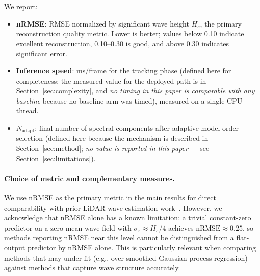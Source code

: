 \documentclass[review]{elsarticle}
\begin{document}
We report:
\begin{itemize}
  \item \textbf{nRMSE}: RMSE normalized by significant wave height $H_s$,
    the primary reconstruction quality metric.
    Lower is better; values below 0.10 indicate excellent reconstruction,
    0.10--0.30 is good, and above 0.30 indicates significant error.
  \item \textbf{Inference speed}: ms/frame for the tracking phase (defined here for
    completeness; the measured value for the deployed path is in
    Section~\ref{sec:complexity}, and \emph{no timing in this paper is comparable
    with any baseline} because no baseline arm was timed),
    measured on a single CPU thread.
  \item \textbf{$N_{\text{adapt}}$}: final number of spectral components
    after adaptive model order selection (defined here because the mechanism is
    described in Section~\ref{sec:method}; \emph{no value is reported in this
    paper} --- see Section~\ref{sec:limitations}).
\end{itemize}

\paragraph{Choice of metric and complementary measures.}
We use nRMSE as the primary metric in the main results for direct
comparability with prior LiDAR wave estimation
work~\citep{desmars2020, desmars2023jfm}.
However, we acknowledge that nRMSE alone has a known limitation:
a trivial constant-zero predictor on a zero-mean wave field with
$\sigma_z \approx H_s/4$ achieves $\text{nRMSE} \approx 0.25$,
so methods reporting nRMSE near this level cannot be distinguished
from a flat-output predictor by nRMSE alone.
This is particularly relevant when comparing methods that may
under-fit (e.g., over-smoothed Gaussian process regression) against
methods that capture wave structure accurately.
\end{document}
